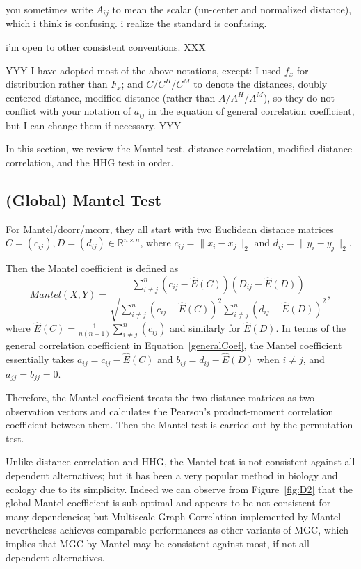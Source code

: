 \documentclass[11pt]{article}
\newcommand{\Real}{\mathbb{R}}
\begin{document}
you sometimes write $A_{ij}$ to mean the scalar (un-center and normalized distance), which i think is confusing. i realize the standard is confusing.

i'm open to other consistent conventions.
XXX

YYY
I have adopted most of the above notations, except: I used $f_{x}$ for distribution rather than $F_{x}$; and $C/C^{H}/C^{M}$ to denote the distances, doubly centered distance, modified distance (rather than $A/A^{H}/A^{M}$), so they do not conflict with your notation of $a_{ij}$ in the equation of general correlation coefficient, but I can change them if necessary.
YYY

In this section, we review the Mantel test, distance correlation, modified distance correlation, and the HHG test in order.

\subsection{(Global) Mantel Test}
\label{sec:mantel}
For Mantel/dcorr/mcorr, they all start with two Euclidean distance matrices $C=(c_{ij}), D=(d_{ij}) \in \Real^{n \times n}$, where $c_{ij}=\|x_{i}-x_{j}\|_{2}$ and $d_{ij}=\|y_{i}-y_{j}\|_{2}$. 

Then the Mantel coefficient \cite{Mantel1967} is defined as 
\begin{equation}
Mantel(X,Y)=\frac{\sum_{i \neq j}^{n}(c_{ij}-\hat{E}(C))(D_{ij}-\hat{E}(D))}{\sqrt{\sum_{i \neq j}^{n}(c_{ij}-\hat{E}(C))^2 \sum_{i \neq j}^{n}(d_{ij}-\hat{E}(D))^2}},
\end{equation}
where $\hat{E}(C)=\frac{1}{n(n-1)}\sum_{i \neq j}^{n}(c_{ij})$ and similarly for $\hat{E}(D)$. In terms of the general correlation coefficient in Equation~\ref{generalCoef}, the Mantel coefficient essentially takes $a_{ij}=c_{ij}-\hat{E}(C)$ and $b_{ij}=d_{ij}-\hat{E}(D)$ when $i \neq j$, and $a_{jj}=b_{jj}=0$.

Therefore, the Mantel coefficient treats the two distance matrices as two observation vectors and calculates the Pearson's product-moment correlation coefficient between them. Then the Mantel test is carried out by the permutation test.

Unlike distance correlation and HHG, the Mantel test is not consistent against all dependent alternatives; but it has been a very popular method in biology and ecology due to its simplicity. Indeed we can observe from Figure~\ref{fig:D2} that the global Mantel coefficient is sub-optimal and appears to be not consistent for many dependencies; but Multiscale Graph Correlation implemented by Mantel nevertheless achieves comparable performances as other variants of MGC, which implies that MGC by Mantel may be consistent against most, if not all dependent alternatives.
\end{document}
